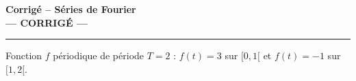 \documentclass[a4paper,11pt]{article}
\begin{document}

\begin{center}
  {\LARGE \textbf{Corrigé -- Séries de Fourier}} \\[0.2cm]
  {\large \textcolor{red!70!black}{\textbf{--- CORRIGÉ ---}}} \\[0.2cm]
  \rule{0.65\textwidth}{0.4pt}
\end{center}

\vspace{0.4cm}

\begin{tcolorbox}[exobox={Exercice 1 — Calcul des coefficients (cas général)}]
Fonction $f$ périodique de période $T = 2$ : $f(t) = 3$ sur $[0,1[$ et $f(t) = -1$ sur $[1,2[$.
\end{tcolorbox}
\end{document}

